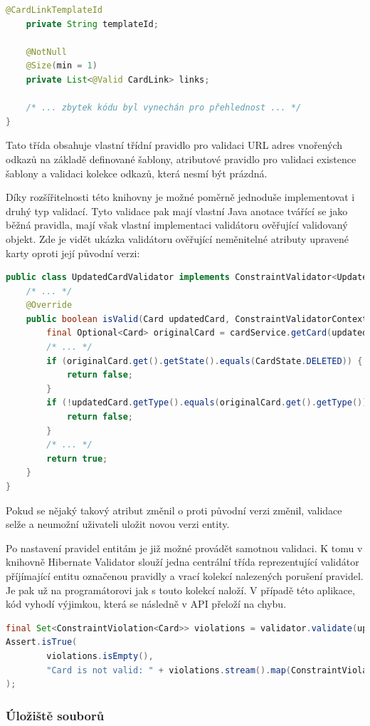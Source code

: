 \begin{itemize}
\begin{itemize}
\begin{lstlisting}[language=Java]
	@CardLinkTemplateId
	private String templateId;

	@NotNull
	@Size(min = 1)
	private List<@Valid CardLink> links;

	/* ... zbytek kódu byl vynechán pro přehlednost ... */
}
		\end{lstlisting}
		Tato třída obsahuje vlastní třídní pravidlo pro validaci \ac{URL} adres vnořených odkazů na základě definované šablony,
		atributové pravidlo pro validaci existence šablony a validaci kolekce odkazů, která nesmí být prázdná.

		Díky rozšířitelnosti této knihovny je možné poměrně jednoduše implementovat i druhý typ validací.
		Tyto validace pak mají vlastní Java anotace tvářící se jako běžná pravidla, mají však vlastní implementaci
		validátoru ověřující validovaný objekt.
		Zde je vidět ukázka validátoru ověřující neměnitelné atributy upravené karty oproti její původní verzi:
		\begin{lstlisting}[language=Java]
public class UpdatedCardValidator implements ConstraintValidator<UpdatedCard, Card> {
	/* ... */
	@Override
	public boolean isValid(Card updatedCard, ConstraintValidatorContext context) {
		final Optional<Card> originalCard = cardService.getCard(updatedCard.getId(), true);
		/* ... */
		if (originalCard.get().getState().equals(CardState.DELETED)) {
			return false;
		}
		if (!updatedCard.getType().equals(originalCard.get().getType())) {
			return false;
		}
		/* ... */
		return true;
	}
}
		\end{lstlisting}
		Pokud se nějaký takový atribut změnil o proti původní verzi změnil, validace selže a neumožní uživateli
		uložit novou verzi entity.

		Po nastavení pravidel entitám je již možné provádět samotnou validaci.
		K tomu v knihovně Hibernate Validator slouží jedna centrální třída reprezentující validátor příjímající
		entitu označenou pravidly a vrací kolekcí nalezených porušení pravidel.
		Je pak už na programátorovi jak s touto kolekcí naloží.
		V případě této aplikace, kód vyhodí výjimkou, která se následně v \ac{API} přeloží na chybu.
		\begin{lstlisting}[language=Java]
final Set<ConstraintViolation<Card>> violations = validator.validate(updatedCard);
Assert.isTrue(
		violations.isEmpty(),
		"Card is not valid: " + violations.stream().map(ConstraintViolation::getMessage).collect(Collectors.joining("; "))
);
		\end{lstlisting}

		\subsubsection{Úložiště souborů}


\end{itemize}
\end{itemize}
